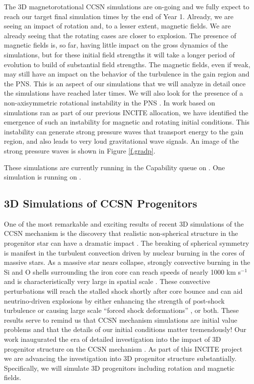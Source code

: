 \documentclass[12pt]{article}
\begin{document}
The 3D magnetorotational CCSN simulations are on-going and we fully expect to reach our target final simulation times by the end of Year 1. 
Already, we are seeing an impact of rotation and, to a lesser extent, magnetic fields.
We are already seeing that the rotating cases are closer to explosion.
The presence of magnetic fields is, so far, having little impact on the gross dynamics of the simulations, but for these initial field strengths it will take a longer period of evolution to build of substantial field strengths. 
The magnetic fields, even if weak, may still have an impact on the behavior of the turbulence in the gain region and the PNS.
This is an aspect of our simulations that we will analyze in detail once the simulations have reached later times. 
We will also look for the presence of a non-axisymmetric rotational instability in the PNS \citep{wheeler:2007, ott:2005}. 
In work based on simulations ran as part of our previous INCITE allocation, we have identified the emergence of such an instability for magnetic and rotating initial conditions. 
This instability can generate strong pressure waves that transport energy to the gain region, and also leads to very loud gravitational wave signals.
An image of the strong pressure waves is shown in Figure \ref{f.gradp}.

These simulations are currently running in the Capability queue on \mira. 
One simulation is running on \thet.

\subsection{3D Simulations of CCSN Progenitors}

One of the most remarkable and exciting results of recent 3D simulations of the CCSN mechanism is the discovery that  realistic non-spherical structure in the progenitor star can have a dramatic impact \citep{couch:2013b, couch:2015, couch:2015a, muller:2015, muller:2017, oconnor:2018b}.
The breaking of spherical symmetry is manifest in the turbulent convection driven by nuclear burning in the cores of massive stars.
As a massive star nears collapse, strongly convective burning in the Si and O shells surrounding the iron core can reach speeds of nearly 1000 km s$^{-1}$ and is characteristically very large in spatial scale \citep{Arnett:2011, couch:2015a, muller:2016a}.
These convective perturbations will reach the stalled shock shortly after core bounce and can aid neutrino-driven explosions by either enhancing the strength of post-shock turbulence \citep{couch:2015} or causing large scale ``forced shock deformations'' \citep{muller:2017}, or both.
These results serve to remind us that CCSN mechanism simulations are initial value problems and that the details of our initial conditions matter tremendously!
Our work inaugurated the era of detailed investigation into the impact of 3D progenitor structure on the CCSN mechanism \citep{couch:2013b, couch:2015a}.
As part of this INCITE project we are advancing the investigation into 3D progenitor structure substantially.
Specifically, we will simulate 3D progenitors including rotation and magnetic fields.
\end{document}
